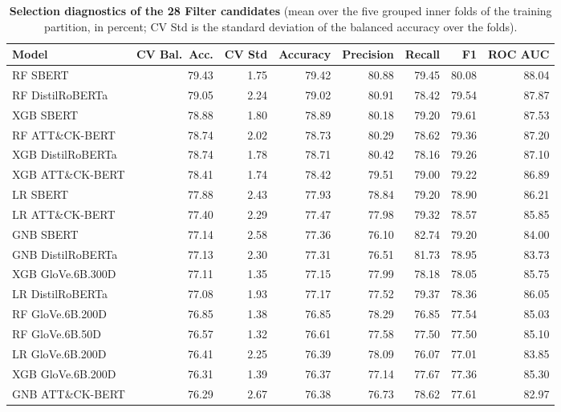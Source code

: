 \begin{table}
    \centering
    \caption{\textbf{Selection diagnostics of the 28 Filter candidates} (mean over the five grouped inner folds of the training partition, in percent; CV Std is the standard deviation of the balanced accuracy over the folds).}
    \label{tab:filter-module}
    \footnotesize
    \begin{tabular}{lrrrrrrr}
        \hline
        \textbf{Model} & \textbf{CV Bal.\ Acc.} & \textbf{CV Std} & \textbf{Accuracy} & \textbf{Precision} & \textbf{Recall} & \textbf{F1} & \textbf{ROC AUC} \\
        \hline
        RF SBERT & 79.43 & 1.75 & 79.42 & 80.88 & 79.45 & 80.08 & 88.04 \\
        RF DistilRoBERTa & 79.05 & 2.24 & 79.02 & 80.91 & 78.42 & 79.54 & 87.87 \\
        XGB SBERT & 78.88 & 1.80 & 78.89 & 80.18 & 79.20 & 79.61 & 87.53 \\
        RF ATT{\&}CK-BERT & 78.74 & 2.02 & 78.73 & 80.29 & 78.62 & 79.36 & 87.20 \\
        XGB DistilRoBERTa & 78.74 & 1.78 & 78.71 & 80.42 & 78.16 & 79.26 & 87.10 \\
        XGB ATT{\&}CK-BERT & 78.41 & 1.74 & 78.42 & 79.51 & 79.00 & 79.22 & 86.89 \\
        LR SBERT & 77.88 & 2.43 & 77.93 & 78.84 & 79.20 & 78.90 & 86.21 \\
        LR ATT{\&}CK-BERT & 77.40 & 2.29 & 77.47 & 77.98 & 79.32 & 78.57 & 85.85 \\
        GNB SBERT & 77.14 & 2.58 & 77.36 & 76.10 & 82.74 & 79.20 & 84.00 \\
        GNB DistilRoBERTa & 77.13 & 2.30 & 77.31 & 76.51 & 81.73 & 78.95 & 83.73 \\
        XGB GloVe.6B.300D & 77.11 & 1.35 & 77.15 & 77.99 & 78.18 & 78.05 & 85.75 \\
        LR DistilRoBERTa & 77.08 & 1.93 & 77.17 & 77.52 & 79.37 & 78.36 & 86.05 \\
        RF GloVe.6B.200D & 76.85 & 1.38 & 76.85 & 78.29 & 76.85 & 77.54 & 85.03 \\
        RF GloVe.6B.50D & 76.57 & 1.32 & 76.61 & 77.58 & 77.50 & 77.50 & 85.10 \\
        LR GloVe.6B.200D & 76.41 & 2.25 & 76.39 & 78.09 & 76.07 & 77.01 & 83.85 \\
        XGB GloVe.6B.200D & 76.31 & 1.39 & 76.37 & 77.14 & 77.67 & 77.36 & 85.30 \\
        GNB ATT{\&}CK-BERT & 76.29 & 2.67 & 76.38 & 76.73 & 78.62 & 77.61 & 82.97 \\

\end{tabular}
\end{table}
